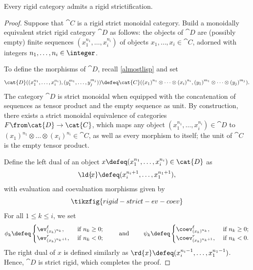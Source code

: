 \begin{theorem}\label{thm: rigid_strictification}
  Every rigid category admits a rigid strictification.
\end{theorem}
\begin{proof}
  Suppose that \(\cat{C}\) is a rigid strict monoidal category.
  Build a monoidally equivalent strict rigid category \(\cat{D}\) as follows:
  the objects of \(\cat{D}\) are (possibly empty) finite sequences
  \((x_1^{n_1}, \dots, x_i^{n_i})\) of objects \(x_1, \dots, x_i \in \cat{C}\),
  adorned with integers \(n_1, \dots, n_i \in \integer\).

  To define the morphisms of \(\cat{D}\),
  recall \cref{almostlisp} and set
  \[
    \cat{D}(
    (x_1^{n_1}, \dots, x_i^{n_i}),
    (y_1^{m_1}, \dots, y_j^{m_j})
    )
    \defeq
    \cat{C}(
    {(x_1)}^{n_1} \otimes \dots \otimes {(x_i)}^{n_i},
    {(y_1)}^{m_1} \otimes \dots \otimes {(y_j)}^{m_j}
    ).
  \]
  The category \(\cat{D}\) is strict monoidal when equipped with the concatenation of sequences as tensor product and the empty sequence as unit.
  By construction, there exists a strict monoidal equivalence of categories \(F \from \cat{D} \to \cat{C}\),
  which maps any object
  \((x_1^{n_1}, \dots, x_i^{n_i}) \in \cat{D}\) to \({(x_1)}^{n_1} \otimes \dots \otimes {(x_i)}^{n_i} \in \cat{C}\),
  as well as every morphism to itself;
  the unit of \(\cat{C}\) is the empty tensor product.

  Define the left dual of an object
  \(x \defeq (x_1^{n_1}, \dots, x_i^{n_i}) \in \cat{D}\)
  as
  \[
    \ld{\!{}x} \defeq (x_i^{n_i+1}, \dots, x_1^{n_1+1}),
  \]
  with
  evaluation and coevaluation morphisms given by
  \[
    \tikzfig{rigid-strict-ev-coev}
  \]
  For all \(1 \leq k \leq i\), we set
  \[
    \phi_k \defeq
    \begin{cases}
      \ev^{\ell}_{{(x_k)}^{n_k}}, &\text{ if } n_k \geq 0; \\
      \ev^r_{{(x_k)}^{n_k+1}}, &\text{ if } n_k < 0; \\
    \end{cases}
    \qquad
    \text{ and }
    \qquad
    \psi_k \defeq
    \begin{cases}
      \coev^{\ell}_{{(x_k)}^{n_k}}, & \text{ if } n_k \geq 0; \\
      \coev^r_{{(x_k)}^{n_k+1}}, &\text{ if } n_k < 0. \\
    \end{cases}
  \]
  The right dual of \(x\) is defined similarly as \(\rd{x} \defeq (x_i^{n_i-1}, \dots, x_1^{n_1-1})\).
  Hence, \(\cat{D}\) is strict rigid, which completes the proof.
\end{proof}

